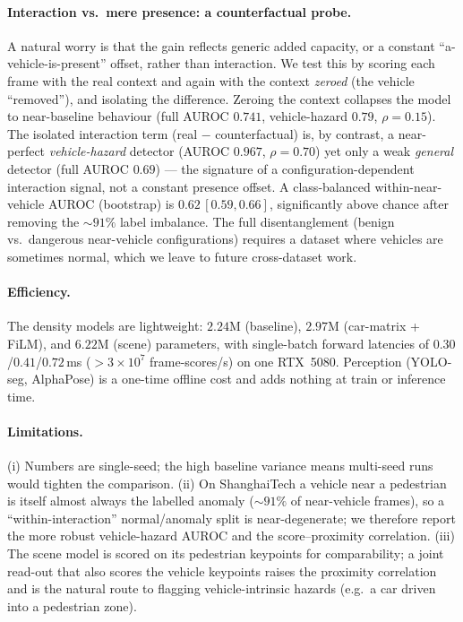 \documentclass{article}
\begin{document}
\paragraph{Interaction vs.\ mere presence: a counterfactual probe.}
A natural worry is that the gain reflects generic added capacity, or a constant
``a-vehicle-is-present'' offset, rather than interaction. We test this by scoring
each frame with the real context and again with the context \emph{zeroed} (the
vehicle ``removed''), and isolating the difference. Zeroing the context collapses
the model to near-baseline behaviour (full AUROC $0.741$, vehicle-hazard $0.79$,
$\rho{=}0.15$). The isolated interaction term (real $-$ counterfactual) is, by
contrast, a near-perfect \emph{vehicle-hazard} detector (AUROC $0.967$,
$\rho{=}0.70$) yet only a weak \emph{general} detector (full AUROC $0.69$) --- the
signature of a configuration-dependent interaction signal, not a constant
presence offset. A class-balanced within-near-vehicle AUROC (bootstrap) is
$0.62\,[0.59,0.66]$, significantly above chance after removing the $\sim\!91\%$
label imbalance. The full disentanglement (benign vs.\ dangerous near-vehicle
configurations) requires a dataset where vehicles are sometimes normal, which we
leave to future cross-dataset work.

\paragraph{Efficiency.}
The density models are lightweight: $2.24$M (baseline), $2.97$M (car-matrix +
FiLM), and $6.22$M (scene) parameters, with single-batch forward latencies of
$0.30$/$0.41$/$0.72$\,ms ($>\!3\times10^{7}$ frame-scores/s) on one RTX~5080.
Perception (YOLO-seg, AlphaPose) is a one-time offline cost and adds nothing at
train or inference time.

\paragraph{Limitations.}
(i) Numbers are single-seed; the high baseline variance means multi-seed runs
would tighten the comparison. (ii) On ShanghaiTech a vehicle near a pedestrian
is itself almost always the labelled anomaly ($\sim\!91\%$ of near-vehicle
frames), so a ``within-interaction'' normal/anomaly split is near-degenerate;
we therefore report the more robust vehicle-hazard AUROC and the
score--proximity correlation. (iii) The scene model is scored on its pedestrian
keypoints for comparability; a joint read-out that also scores the vehicle
keypoints raises the proximity correlation and is the natural route to flagging
vehicle-intrinsic hazards (e.g.\ a car driven into a pedestrian zone).
\end{document}
